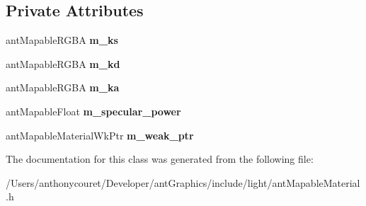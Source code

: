 \subsection*{Private Attributes}
\begin{DoxyCompactItemize}
\item 
\hypertarget{classant_mapable_material_a292b7bc8be1dbc3176e983f871a6e087}{ant\+Mapable\+R\+G\+B\+A {\bfseries m\+\_\+ks}}\label{classant_mapable_material_a292b7bc8be1dbc3176e983f871a6e087}

\item 
\hypertarget{classant_mapable_material_aee669912b96bd5d2fd12113a9500260f}{ant\+Mapable\+R\+G\+B\+A {\bfseries m\+\_\+kd}}\label{classant_mapable_material_aee669912b96bd5d2fd12113a9500260f}

\item 
\hypertarget{classant_mapable_material_a7eeeda67927feebdcceedbbe57e7c200}{ant\+Mapable\+R\+G\+B\+A {\bfseries m\+\_\+ka}}\label{classant_mapable_material_a7eeeda67927feebdcceedbbe57e7c200}

\item 
\hypertarget{classant_mapable_material_a703681b1c7007afa697fda42ccef51f9}{ant\+Mapable\+Float {\bfseries m\+\_\+specular\+\_\+power}}\label{classant_mapable_material_a703681b1c7007afa697fda42ccef51f9}

\item 
\hypertarget{classant_mapable_material_a2adf1305b7eff4131ac48517b8a57c82}{ant\+Mapable\+Material\+Wk\+Ptr {\bfseries m\+\_\+weak\+\_\+ptr}}\label{classant_mapable_material_a2adf1305b7eff4131ac48517b8a57c82}

\end{DoxyCompactItemize}


The documentation for this class was generated from the following file\+:\begin{DoxyCompactItemize}
\item 
/\+Users/anthonycouret/\+Developer/ant\+Graphics/include/light/ant\+Mapable\+Material.\+h\end{DoxyCompactItemize}
